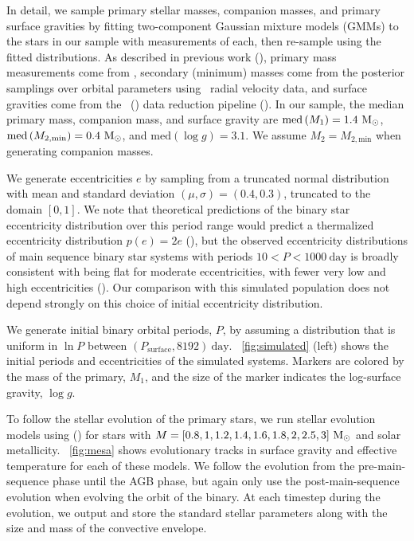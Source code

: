 \documentclass[modern, letterpaper]{aastex62}
\newcommand{\apogee}{\project{\acronym{APOGEE}}}
\newcommand{\DR}{\acronym{DR14}}
\newcommand{\logg}{\ensuremath{\log g}}
\newcommand{\med}[1]{\ensuremath{\textrm{med}\left(#1\right)}}
\newcommand{\Psurf}{\ensuremath{P_\textrm{surface}}}
\begin{document}
In detail, we sample primary stellar masses, companion masses, and primary
surface gravities by fitting two-component Gaussian mixture models (GMMs) to the
stars in our sample with measurements of each, then re-sample using the fitted
distributions.
As described in previous work (\citealt{Price-Whelan:2018}), primary mass
measurements come from \cite{Ness:2015}, secondary (minimum) masses come from
the posterior samplings over orbital parameters using \apogee\ radial velocity
data, and surface gravities come from the \apogee\ (\DR) data reduction pipeline
(\citealt{Garcia-Perez:2016}).
In our sample, the median primary mass, companion mass, and surface gravity are
$\med{M_1} = 1.4~\msun$, $\med{M_{2, \textrm{min}}} = 0.4~\msun$, and
$\med{\logg} = 3.1$.
We assume $M_2 = M_{2, \textrm{min}}$ when generating companion masses.

We generate eccentricities $e$ by sampling from a truncated normal distribution
with mean and standard deviation $(\mu, \sigma) = (0.4, 0.3)$, truncated to the
domain $[0, 1]$.
We note that theoretical predictions of the binary star eccentricity
distribution over this period range would predict a thermalized eccentricity
distribution $p(e) = 2e$ (\citealt{Jeans:1919}), but the observed eccentricity
distributions of main sequence binary star systems with periods $10 < P <
1000~\textrm{day}$ is broadly consistent with being flat for moderate
eccentricities, with fewer very low and high eccentricities
(\citealt{Duchene:2013}).
Our comparison with this simulated population does not depend strongly on this
choice of initial eccentricity distribution.

We generate initial binary orbital periods, $P$, by assuming a distribution that
is uniform in $\ln P$ between $(\Psurf, 8192)~\textrm{day}$.
\figurename~\ref{fig:simulated} (left) shows the initial periods and
eccentricities of the simulated systems.
Markers are colored by the mass of the primary, $M_1$, and the size of the
marker indicates the log-surface gravity, \logg.

To follow the stellar evolution of the primary stars, we run stellar evolution
models using  (\citealt{Paxton:2011}) for stars with $M = [0.8, 1,
1.2, 1.4, 1.6, 1.8, 2, 2.5, 3]~\mathrm{M}_\odot$ and solar metallicity.
\figurename~\ref{fig:mesa} shows evolutionary tracks in surface gravity and
effective temperature for each of these models.
We follow the evolution from the pre-main-sequence phase until the AGB phase,
but again only use the post-main-sequence evolution when evolving the orbit of
the binary.
At each timestep during the evolution, we output and store the standard stellar
parameters along with the size and mass of the convective envelope.
\end{document}
